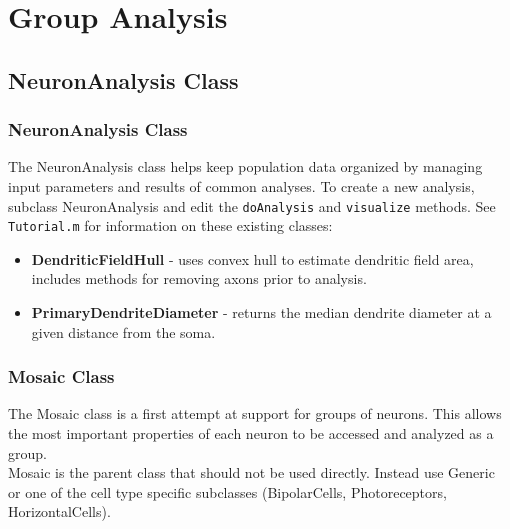 \documentclass[11pt]{beamer}
\begin{document}
\section{Group Analysis}
\subsection{NeuronAnalysis Class}
\begin{frame}
	\frametitle{NeuronAnalysis Class}
	The NeuronAnalysis class helps keep population data organized by managing input parameters and results of common analyses. To create a new analysis, subclass NeuronAnalysis and edit the \texttt{doAnalysis} and \texttt{visualize} methods.
	\vskip10pt
	See \texttt{Tutorial.m} for information on these existing classes:
	\begin{itemize}
		\item \textbf{DendriticFieldHull} - uses convex hull to estimate dendritic field area, includes methods for removing axons prior to analysis.
		\item \textbf{PrimaryDendriteDiameter} - returns the median dendrite diameter at a given distance from the soma.
	\end{itemize}
\end{frame}
\begin{frame}[fragile]
	\frametitle{Mosaic Class}
	The Mosaic class is a first attempt at support for groups of neurons. This allows the most important properties of each neuron to be accessed and analyzed as a group.\\
	\vskip10pt
	Mosaic is the parent class that should not be used directly. Instead use Generic or one of the cell type specific subclasses (BipolarCells, Photoreceptors, HorizontalCells). 
\end{frame}
\end{document}

